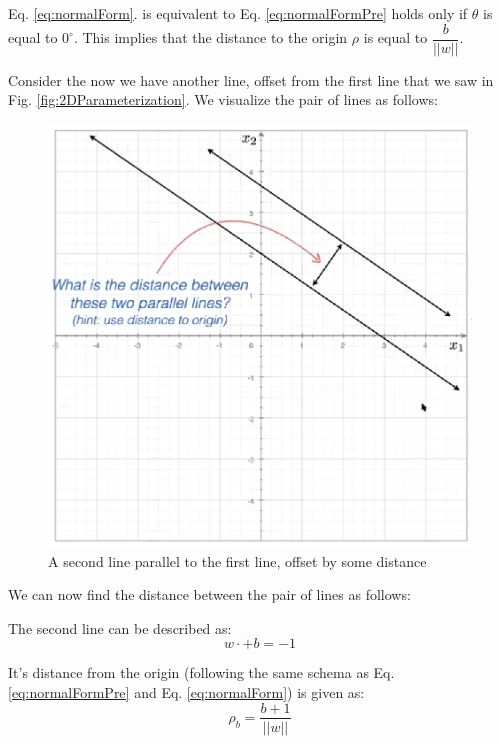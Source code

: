 \documentclass[11pt]{article}
\begin{document}
Eq. \ref{eq:normalForm}. is equivalent to Eq. \ref{eq:normalFormPre} holds only if $\theta$ is equal to $0^\circ$. This implies that the distance to the origin $\rho$ is equal to $\dfrac{b}{||w||}$.

Consider the now we have another line, offset from the first line that we saw in Fig. \ref{fig:2DParameterization}. We visualize the pair of lines as follows:

\begin{figure}[h]
    \centering
    \includegraphics[scale = 0.30]{figures/22DLines.png}
    \caption{A second line parallel to the first line, offset by some distance}
    \label{fig:22DLines}
\end{figure}

We can now find the distance between the pair of lines as follows:

The second line can be described as:
\begin{equation}
    w \cdot + b = - 1
\end{equation}

It's distance from the origin (following the same schema as Eq. \ref{eq:normalFormPre} and Eq. \ref{eq:normalForm}) is given as:
\begin{equation}
    \rho_b = \dfrac{b + 1}{||w||}
\end{equation}
\end{document}
